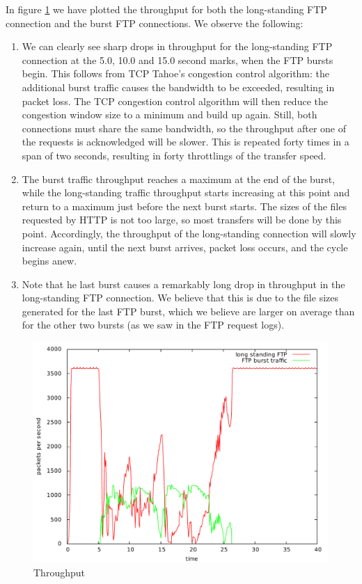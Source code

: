 \documentclass[10pt,a4paper]{article}
\begin{document}
In figure \ref{fig:burst_traffic} we have plotted the throughput for
both the long-standing FTP connection and the burst FTP
connections. We observe the following:

\begin{enumerate}
\item We can clearly see sharp drops in throughput for the
  long-standing FTP connection at the 5.0, 10.0 and 15.0 second marks,
  when the FTP bursts begin. This follows from TCP Tahoe's congestion
  control algorithm: the additional burst traffic causes the bandwidth
  to be exceeded, resulting in packet loss. The TCP congestion control
  algorithm will then reduce the congestion window size to a minimum
  and build up again. Still, both connections must share the
  same bandwidth, so the throughput after one of the requests is
  acknowledged will be slower. This is repeated forty times in a span
  of two seconds, resulting in forty throttlings of the transfer speed.
\item The burst traffic throughput reaches a maximum at the end of the
  burst, while the long-standing traffic throughput starts increasing at this
  point and return to a maximum just before the next burst starts. The
  sizes of the files requested by HTTP is not too large, so most
  transfers will be done by this point. Accordingly, the throughput of
  the long-standing connection will slowly increase again, until the
  next burst arrives, packet loss occurs, and the cycle begins anew.
\item Note that he last burst causes a remarkably long drop in
  throughput in the long-standing FTP connection. We believe that this
  is due to the file sizes generated for the last FTP burst, which we
  believe are larger on average than for the other two bursts (as we
  saw in the FTP request logs).
\end{enumerate}

\begin{figure}[p]
    \centering
    \includegraphics[width=\textwidth]{../part2/q1/plots/1.pdf}
    \caption{Throughput}
    \label{fig:burst_traffic}
\end{figure}
\end{document}
